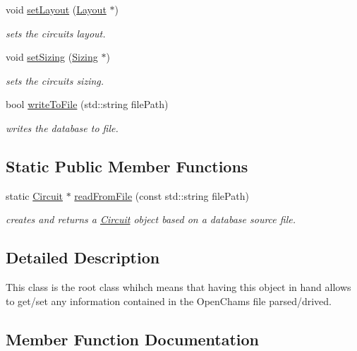 \begin{DoxyCompactItemize}
void \mbox{\hyperlink{class_open_chams_1_1_circuit_a4babcbc5b9f7797cc0befb675d5f538c}{set\+Layout}} (\mbox{\hyperlink{class_open_chams_1_1_layout}{Layout}} $\ast$)
\begin{DoxyCompactList}\small\item\em sets the circuit\textquotesingle{}s layout. \end{DoxyCompactList}\item 
void \mbox{\hyperlink{class_open_chams_1_1_circuit_ab065572c5c1d9beb304324f2d2d8b525}{set\+Sizing}} (\mbox{\hyperlink{class_open_chams_1_1_sizing}{Sizing}} $\ast$)
\begin{DoxyCompactList}\small\item\em sets the circuit\textquotesingle{}s sizing. \end{DoxyCompactList}\item 
bool \mbox{\hyperlink{class_open_chams_1_1_circuit_a2eb07935ec946a07edcee2255b781193}{write\+To\+File}} (std\+::string file\+Path)
\begin{DoxyCompactList}\small\item\em writes the database to file. \end{DoxyCompactList}\end{DoxyCompactItemize}
\subsection*{Static Public Member Functions}
\begin{DoxyCompactItemize}
\item 
static \mbox{\hyperlink{class_open_chams_1_1_circuit}{Circuit}} $\ast$ \mbox{\hyperlink{class_open_chams_1_1_circuit_ad0aa3183bdea59e62f69c295026b7fe7}{read\+From\+File}} (const std\+::string file\+Path)
\begin{DoxyCompactList}\small\item\em creates and returns a \mbox{\hyperlink{class_open_chams_1_1_circuit}{Circuit}} object based on a database source file. \end{DoxyCompactList}\end{DoxyCompactItemize}


\subsection{Detailed Description}
This class is the root class whihch means that having this object in hand allows to get/set any information contained in the Open\+Chams file parsed/drived. 

\subsection{Member Function Documentation}
\mbox{\label{class_open_chams_1_1_circuit_a7c1c09f44cf215dc17d3dd2518e32389}} 

